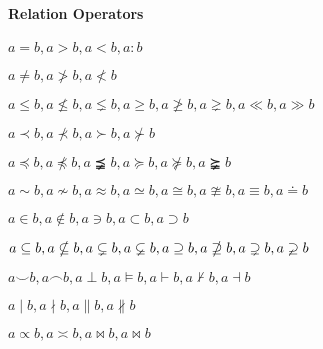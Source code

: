 \paragraph{Relation Operators}
{\LARGE
    $ a = b, a > b, a < b, a : b $

    $ a \neq b,     %
    a \ngtr b,      %
    a \nless b $    %

    $ a \leq b,     %
    a \nleq b, a \lneq b, a \geq b,    %
    a \ngeq b, a \gneq b, a \ll b,     %
    a \gg b $       %

    $ a \prec b, a \nprec b, a \succ b, a \nsucc b $

    $ a \preceq b, a \npreceq b, a \precneqq b, a \succeq b, a \nsucceq b, a \succneqq b $

    $ a \sim b, a \nsim b, a \approx b,     %
    a \simeq b,     %
    a \cong b, a \ncong b, a \equiv b,      %
    a \doteq b $    %

    $ a \in b, a \notin b,  %
    a \ni b,        %
    a \subset b,    %
    a \supset b $   %

    $ a \subseteq b, a \nsubseteq b, a \subsetneq b, a \varsubsetneq b, 
    a \supseteq b, a \nsupseteq b, a \supsetneq b, a \varsupsetneq b $

    $ a \smile b,   %
    a \frown b,     %
    a \perp b,      %
    a \models b,    %
    a \vdash b, a \nvdash b, a \dashv b $   %

    $ a \mid b, a \nmid b, a \parallel b, a \nparallel b $
    

    $ a \propto b,  %
    a \asymp b,     %
    a \bowtie b, a \Join b $    %
}

\vspace{2em}

